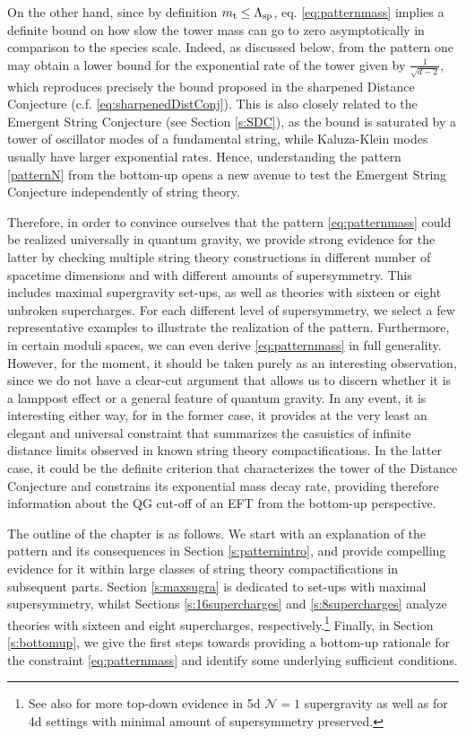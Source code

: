 On the other hand, since by definition $m_{\text{t}}\leq \Lambda_{\text{sp}}$, eq. \eqref{eq:patternmass} implies a definite bound on how slow the tower mass can go to zero asymptotically in comparison to the species scale. Indeed, as discussed below, from the pattern one may obtain a lower bound for the exponential rate of the tower given by $\frac{1}{\sqrt{d-2}}$, which reproduces precisely the bound proposed in the sharpened Distance Conjecture (c.f. \eqref{eq:sharpenedDistConj}). This is also closely related to the Emergent String Conjecture (see Section \ref{s:SDC}), as the bound is saturated by a tower of oscillator modes of a fundamental string, while Kaluza-Klein modes usually have larger exponential rates. Hence, understanding the pattern \eqref{patternN} from the bottom-up opens a new avenue to test the Emergent String Conjecture independently of string theory.
	
Therefore, in order to convince ourselves that the pattern \eqref{eq:patternmass} could be realized universally in quantum gravity, we provide strong evidence for the latter by checking multiple string theory constructions in different number of spacetime dimensions and with different amounts of supersymmetry. This includes maximal supergravity set-ups, as well as theories with sixteen or eight unbroken supercharges. For each different level of supersymmetry, we select a few representative examples to illustrate the realization of the pattern. Furthermore, in certain moduli spaces, we can even derive \eqref{eq:patternmass} in full generality. However, for the moment, it should be taken purely as an interesting observation, since we do not have a clear-cut argument that allows us to discern whether it is a lamppost effect or a general feature of quantum gravity. In any event, it is interesting either way, for in the former case, it provides at the very least an elegant and universal constraint that summarizes the casuistics of infinite distance limits observed in known string theory compactifications. In the latter case, it could be the definite criterion that characterizes the tower of the Distance Conjecture and constrains its exponential mass decay rate, providing therefore information about the QG cut-off of an EFT from the bottom-up perspective. 
	
The outline of the chapter is as follows. We start with an explanation of the pattern and its consequences in Section \ref{s:patternintro}, and provide compelling evidence for it within large classes of string theory compactifications in subsequent parts. Section \ref{s:maxsugra} is dedicated to set-ups with maximal supersymmetry, whilst Sections \ref{s:16supercharges} and \ref{s:8supercharges} analyze theories with sixteen and eight supercharges, respectively.\footnote{See also \cite{Rudelius:2023spc} for more top-down evidence in 5d $\mathcal{N}=1$ supergravity as well as \cite{Castellano:2023jjt} for 4d settings with minimal amount of supersymmetry preserved.} Finally, in Section \ref{s:bottomup}, we give the first steps towards providing a bottom-up rationale for the constraint \eqref{eq:patternmass} and identify some underlying sufficient conditions.


